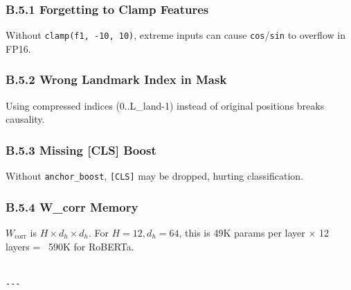 \subsubsection{B.5.1 Forgetting to Clamp Features}

Without \texttt{clamp(f1, -10, 10)}, extreme inputs can cause \texttt{cos}/\texttt{sin} to 
overflow in FP16.

\subsubsection{B.5.2 Wrong Landmark Index in Mask}

Using compressed indices (0..L\_land-1) instead of original positions 
breaks causality.

\subsubsection{B.5.3 Missing [CLS] Boost}

Without \texttt{anchor\_boost}, \texttt{[CLS]} may be dropped, hurting classification.

\subsubsection{B.5.4 W\_corr Memory}

$W_\text{corr}$ is $H \times d_h \times d_h$. For $H = 12, d_h = 64$, 
this is 49K params per layer $\times$ 12 layers = ~590K for RoBERTa.
\begin{lstlisting}

---
\end{lstlisting}
